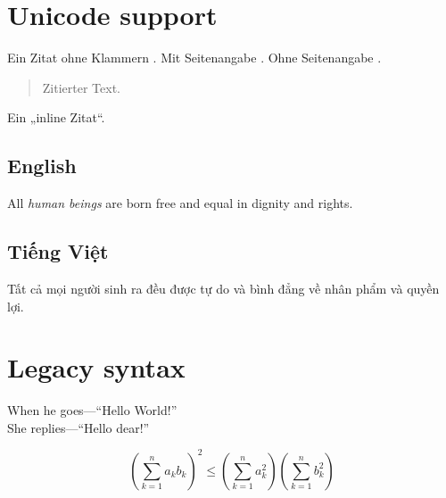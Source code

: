\section{Unicode support}

Ein Zitat ohne Klammern \citet{default}.
Mit Seitenangabe \citep[siehe][S.~15]{default}.
Ohne Seitenangabe \citep{default}.

\begin{quote}
Zitierter Text.
\end{quote}

\noindent Ein „inline Zitat“.

\subsection{English}
All \emph{human beings} are born free and equal in dignity and rights.
 
\subsection{Tiếng Việt}
Tất cả mọi người sinh ra đều được tự do và bình đẳng về nhân phẩm và 
quyền lợi.
 
\section{Legacy syntax}
When he goes---``Hello World!''\\
She replies—“Hello dear!”
 
$$\left( \sum_{k=1}^n a_k b_k \right)^2 \leq \left( \sum_{k=1}^n a_k^2 \right) \left( \sum_{k=1}^n b_k^2 \right)$$
